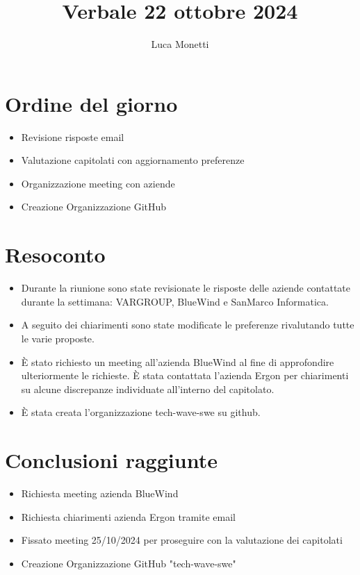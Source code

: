 \documentclass{TWReport}
\title{Verbale 22 ottobre 2024}
\author{Luca Monetti}
\begin{document}
\frontmatter

\showPartecipants

\section*{Ordine del giorno}
\begin{itemize}
    \item Revisione risposte email
    \item Valutazione capitolati con aggiornamento preferenze
    \item Organizzazione meeting con aziende
    \item Creazione Organizzazione GitHub

\end{itemize}

\section*{Resoconto}
\begin{itemize}
    \item Durante la riunione sono state revisionate le risposte delle aziende contattate durante la settimana: VARGROUP, BlueWind e SanMarco Informatica.
    \item A seguito dei chiarimenti sono state modificate le preferenze rivalutando tutte le varie proposte.
    \item È stato richiesto un meeting all’azienda BlueWind al fine di approfondire ulteriormente le richieste.
    È stata contattata l’azienda Ergon per chiarimenti su alcune discrepanze individuate all’interno del capitolato.
    \item È stata creata l’organizzazione tech-wave-swe su github.


\end{itemize}

\section*{Conclusioni raggiunte}
\begin{itemize}
    \item Richiesta meeting azienda BlueWind
    \item Richiesta chiarimenti azienda Ergon tramite email
    \item Fissato meeting 25/10/2024 per proseguire con la valutazione dei capitolati
    \item Creazione Organizzazione GitHub "tech-wave-swe"

\end{itemize}
\end{document}
